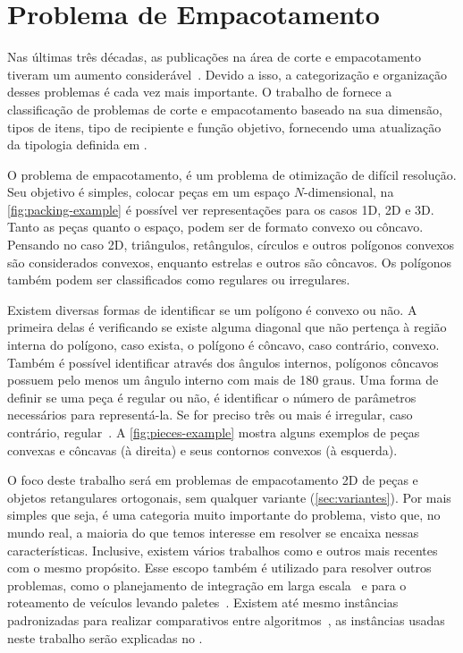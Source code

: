 \chapter{Problema de Empacotamento}\label{ch:problema-de-empacotamento}

Nas últimas três décadas, as publicações na área de corte e empacotamento tiveram um aumento
considerável~\cite{exact-solution-techniques,wascher2007improved}.
Devido a isso, a categorização e organização desses problemas é cada vez mais importante.
O trabalho de  fornece a classificação de problemas de corte e
empacotamento baseado na sua dimensão, tipos de itens, tipo de recipiente e função objetivo,
fornecendo uma atualização da tipologia definida em .

O problema de empacotamento, é um problema de otimização de difícil resolução.
Seu objetivo é simples, colocar peças em um espaço $N$-dimensional, na \autoref{fig:packing-example}
é possível ver representações para os casos 1D, 2D e 3D\@.
Tanto as peças quanto o espaço, podem ser de formato convexo ou côncavo.
Pensando no caso 2D, triângulos, retângulos, círculos e outros polígonos convexos são
considerados convexos, enquanto estrelas e outros são côncavos.
Os polígonos também podem ser classificados como regulares ou irregulares.



Existem diversas formas de identificar se um polígono é convexo ou não.
A primeira delas é verificando se existe alguma diagonal que não pertença à região interna do
polígono, caso exista, o polígono é côncavo, caso contrário, convexo.
Também é possível identificar através dos ângulos internos, polígonos côncavos possuem pelo menos
um ângulo interno com mais de 180 graus.
Uma forma de definir se uma peça é regular ou não, é identificar o número de parâmetros
necessários para representá-la.
Se for preciso três ou mais é irregular, caso contrário, regular~\cite{aprendizado-reforco}.
A \autoref{fig:pieces-example} mostra alguns exemplos de peças convexas e côncavas (à direita)
e seus contornos convexos (à esquerda).



O foco deste trabalho será em problemas de empacotamento 2D de peças e objetos retangulares
ortogonais, sem qualquer variante (\autoref{sec:variantes}).
Por mais simples que seja, é uma categoria muito importante do problema, visto que, no mundo real,
a maioria do que temos interesse em resolver se encaixa nessas características.
Inclusive, existem vários trabalhos como  e outros mais recentes~\cite{
    martin2020models,firat2020effective,chen2019efficient} com o mesmo propósito.
Esse escopo também é utilizado para resolver outros problemas, como o planejamento de integração em
larga escala~\cite{huang2007efficient} e para o roteamento de veículos levando paletes~\cite{
    silva2022integer}.
Existem até mesmo instâncias padronizadas para realizar comparativos entre algoritmos~\cite{
    2DPackLib}, as instâncias usadas neste trabalho serão explicadas no .


